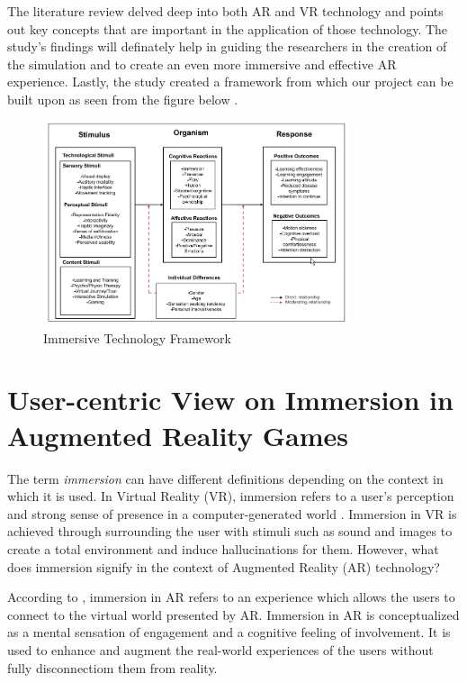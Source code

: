 The literature review delved deep into both AR and VR technology and points out key concepts that are important in the application of those technology. The study's findings will definately help in guiding the researchers in the creation of the simulation and to create an even more immersive and effective AR experience. Lastly, the study created a framework from which our project can be built upon as seen from the figure below \cite{suh2018}.

\begin{figure}[h]
    \centering
    \includegraphics[width=0.8\textwidth]{figures/ImmersiveFramework.png}
    \caption{Immersive Technology Framework}
\end{figure}

\section{User-centric View on Immersion in Augmented Reality Games}

The term \textit{immersion} can have different definitions depending on the context in which it is used. In Virtual Reality (VR), immersion refers to a user's perception and strong sense of presence in a computer-generated world \cite{immersionAR}. Immersion in VR is achieved through surrounding the user with stimuli such as sound and images to create a total environment and induce hallucinations for them. However, what does immersion signify in the context of Augmented Reality (AR) technology? 

According to \cite{immersionAR}, immersion in AR refers to an experience which allows the users to connect to the virtual world presented by AR. Immersion in AR is conceptualized as a mental sensation of engagement and a cognitive feeling of involvement. It is used to enhance and augment the real-world experiences of the users without fully disconnectiom them from reality.














